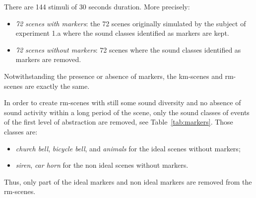 \documentclass[12pt]{elsarticle}
\newcommand{\ie}{\emph{i.\,e.}}
\newcommand{\cf}{cf.}
\begin{document}
There are 144 stimuli of 30 seconds duration. More precisely:

\begin{itemize}
\item \emph{72 scenes with markers}: the 72 scenes originally simulated by the subject of experiment 1.a where the sound classes identified as markers are kept.
\item \emph{72 scenes without markers}:  72 scenes where the sound classes identified as markers are removed.
\end{itemize}


Notwithstanding the presence or absence of markers, the km-scenes and rm-scenes are exactly the same.


In order to create rm-scenes with still some sound diversity and no  absence of sound activity within a long period of the scene, only the sound classes of events of the first level of abstraction are removed, see Table~\ref{tab:markers}. Those classes are:


\begin{itemize}
\item \emph{church bell}, \emph{bicycle bell}, and \emph{animals} for the ideal scenes without markers;
\item \emph{siren}, \emph{car horn} for the non ideal scenes without markers.
\end{itemize}


Thus, only part of the ideal markers and non ideal markers are removed from the rm-scenes.
\end{document}
